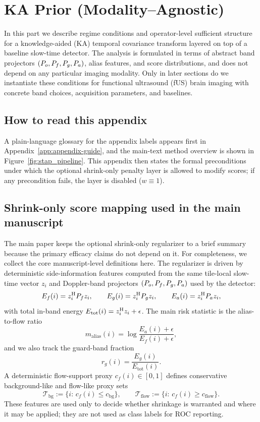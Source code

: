 \section{KA Prior (Modality--Agnostic)}
\label{app:ka-contract-theory}

In this part we describe regime conditions and operator-level sufficient structure for a knowledge-aided (KA) temporal covariance transform layered on top of a baseline slow-time detector. The analysis is formulated in terms of abstract band projectors $(P_o,P_f,P_g,P_a)$, alias features, and score distributions, and does not depend on any particular imaging modality. Only in later sections do we instantiate these conditions for functional ultrasound (fUS) brain imaging with concrete band choices, acquisition parameters, and baselines.

\subsection*{How to read this appendix}
A plain-language glossary for the appendix labels appears first in Appendix~\ref{app:appendix-guide}, and the main-text method overview is shown in Figure~\ref{fig:stap_pipeline}. This appendix then states the formal preconditions under which the optional shrink-only penalty layer is allowed to modify scores; if any precondition fails, the layer is disabled ($w\equiv 1$).

\subsection{Shrink-only score mapping used in the main manuscript}
The main paper keeps the optional shrink-only regularizer to a brief summary because the primary efficacy claims do not depend on it. For completeness, we collect the core manuscript-level definitions here. The regularizer is driven by deterministic side-information features computed from the same tile-local slow-time vector $z_i$ and Doppler-band projectors $(P_o,P_f,P_g,P_a)$ used by the detector:
\[
  E_f(i)=z_i^{\mathrm{H}} P_f z_i,\qquad
  E_g(i)=z_i^{\mathrm{H}} P_g z_i,\qquad
  E_a(i)=z_i^{\mathrm{H}} P_a z_i,
\]
with total in-band energy $E_{\mathrm{tot}}(i)=z_i^{\mathrm{H}} z_i+\epsilon$. The main risk statistic is the alias-to-flow ratio
\[
  m_{\mathrm{alias}}(i)=\log\frac{E_a(i)+\epsilon}{E_f(i)+\epsilon},
\]
and we also track the guard-band fraction
\[
  r_g(i)=\frac{E_g(i)}{E_{\mathrm{tot}}(i)}.
\]
A deterministic flow-support proxy $c_f(i)\in[0,1]$ defines conservative background-like and flow-like proxy sets
\[
  \mathcal{T}_{\mathrm{bg}}:=\{i:\,c_f(i)\le c_{\mathrm{bg}}\},\qquad
  \mathcal{T}_{\mathrm{flow}}:=\{i:\,c_f(i)\ge c_{\mathrm{flow}}\}.
\]
These features are used only to decide whether shrinkage is warranted and where it may be applied; they are not used as class labels for ROC reporting.

